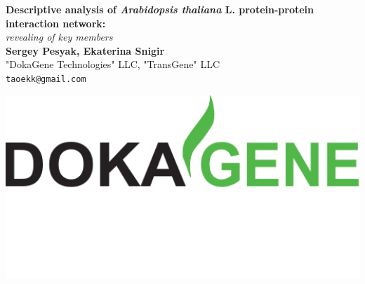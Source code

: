 \documentclass[a0,portrait]{a0poster}
\begin{document}


\begin{minipage}[b]{0.75\linewidth}
\veryHuge \color{NavyBlue} \textbf{Descriptive analysis of \textit{Arabidopsis thaliana} L. protein-protein interaction network:} \color{Black}\\ %
\Huge\textit{revealing of key members}\\[2cm] %
\huge \textbf{Sergey Pesyak, Ekaterina Snigir}\\[0.5cm] %
\huge "DokaGene Technologies" LLC, "TransGene" LLC\\[0.4cm] %
\Large \texttt{taoekk@gmail.com}\\
\end{minipage}
%
\begin{minipage}[b]{0.25\linewidth}
\includegraphics[width=20cm]{logo.pdf}\\
\end{minipage}

\vspace{.5cm} %

\end{document}
